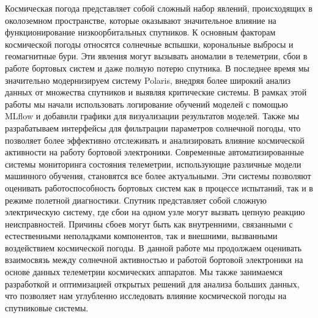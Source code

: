 Космическая погода представляет собой сложный набор явлений, происходящих в
околоземном пространстве, которые оказывают значительное влияние на
функционирование низкоорбитальных спутников. К основным факторам космической
погоды относятся солнечные вспышки, корональные выбросы и геомагнитные бури.
Эти явления могут вызывать аномалии в телеметрии, сбои в работе бортовых систем
и даже полную потерю спутника. В последнее время мы значительно модернизируем
систему Polaris, внедряя более широкий анализ данных от множества спутников и
выявляя критические системы. В рамках этой работы мы начали использовать
логирование обучений моделей с помощью MLflow и добавили графики для
визуализации результатов моделей. Также мы разрабатываем интерфейсы для
фильтрации параметров солнечной погоды, что позволяет более эффективно
отслеживать и анализировать влияние космической активности на работу бортовой
электроники. Современные автоматизированные системы мониторинга состояния
телеметрии, использующие различные модели машинного обучения, становятся все
более актуальными. Эти системы позволяют оценивать работоспособность бортовых
систем как в процессе испытаний, так и в режиме полетной диагностики. Спутник
представляет собой сложную электрическую систему, где сбои на одном узле могут
вызвать цепную реакцию неисправностей. Причины сбоев могут быть как
внутренними, связанными с естественными неполадками компонентов, так и
внешними, вызванными воздействием космической погоды. В данной работе мы
продолжаем оценивать взаимосвязь между солнечной активностью и работой бортовой
электроники на основе данных телеметрии космических аппаратов. Мы также
занимаемся разработкой и оптимизацией открытых решений для анализа больших
данных, что позволяет нам углубленно исследовать влияние космической погоды на
спутниковые системы.
